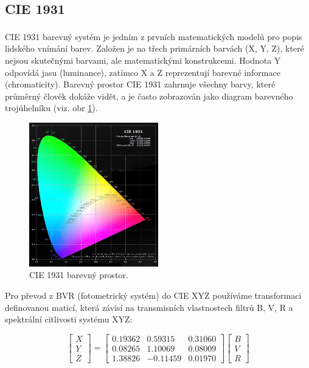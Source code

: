 \documentclass[a4paper,11pt,twocolumn]{article}
\begin{document}
        \subsection{CIE 1931}
            CIE 1931\textsuperscript{\cite{1931TrOS...33...73S}} barevný systém je jedním z prvních matematických modelů pro popis lidského vnímání barev. Založen je na třech primárních barvách (X, Y, Z), které nejsou skutečnými barvami, ale matematickými konstrukcemi. Hodnota Y odpovídá jasu (luminance), zatímco X a Z reprezentují barevné informace (chromaticity). Barevný prostor CIE 1931 zahrnuje všechny barvy, které průměrný člověk dokáže vidět, a je často zobrazován jako diagram barevného trojúhelníku (viz. obr \ref{fig:cie}).

            \begin{figure}
                \centering
                \includegraphics[width=0.5\textwidth]{cie}
                \caption{CIE 1931 barevný prostor.}
                \label{fig:cie}
            \end{figure}

            Pro převod z BVR (fotometrický systém) do CIE XYZ používáme transformaci definovanou maticí, která závisí na transmisních vlastnostech filtrů B, V, R a spektrální citlivosti systému XYZ:

            \begin{equation}
                \begin{bmatrix}
                    X \\
                    Y \\
                    Z
                \end{bmatrix}
                =
                \begin{bmatrix}
                    0.19362 & 0.59315 & 0.31060 \\
                    0.08265 & 1.10069 & 0.08009 \\
                    1.38826 & -0.11459 & 0.01970
                \end{bmatrix}
                \begin{bmatrix}
                    B \\
                    V \\
                    R
                \end{bmatrix}
                \label{brv_xyz}
            \end{equation}
\end{document}
